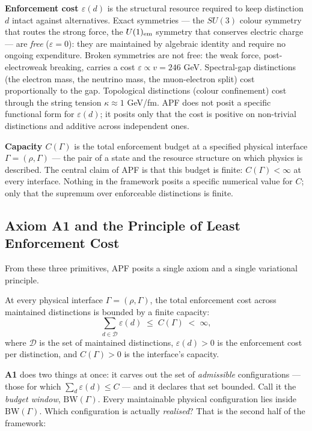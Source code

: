 \documentclass[11pt]{article}
\newcommand{\Aone}{\textbf{A1}}
\begin{document}
\smallskip
\noindent\textbf{Enforcement cost $\varepsilon(d)$} is the structural resource required to keep distinction $d$ intact against alternatives. Exact symmetries --- the $SU(3)$ colour symmetry that routes the strong force, the $U(1)_{\rm em}$ symmetry that conserves electric charge --- are \emph{free} ($\varepsilon = 0$): they are maintained by algebraic identity and require no ongoing expenditure. Broken symmetries are not free: the weak force, post-electroweak breaking, carries a cost $\varepsilon \propto v = 246$ GeV. Spectral-gap distinctions (the electron mass, the neutrino mass, the muon-electron split) cost proportionally to the gap. Topological distinctions (colour confinement) cost through the string tension $\kappa \approx 1$ GeV/fm. APF does not posit a specific functional form for $\varepsilon(d)$; it posits only that the cost is positive on non-trivial distinctions and additive across independent ones.

\smallskip
\noindent\textbf{Capacity $C(\Gamma)$} is the total enforcement budget at a specified physical interface $\Gamma = (\rho, \Gamma)$ --- the pair of a state and the resource structure on which physics is described. The central claim of APF is that this budget is finite: $C(\Gamma) < \infty$ at every interface. Nothing in the framework posits a specific numerical value for $C$; only that the supremum over enforceable distinctions is finite.

\subsection{Axiom \texorpdfstring{\Aone{}}{A1} and the Principle of Least Enforcement Cost}\label{sec:intro_A1_PLEC}

From these three primitives, APF posits a single axiom and a single variational principle.

\begin{tcolorbox}[apfbox, title={Axiom \Aone{} --- Finite Enforcement Capacity}]
At every physical interface $\Gamma = (\rho, \Gamma)$, the total enforcement cost across maintained distinctions is bounded by a finite capacity:
\[
\sum_{d \in \mathcal{D}} \varepsilon(d) \;\leq\; C(\Gamma) \;<\; \infty,
\]
where $\mathcal{D}$ is the set of maintained distinctions, $\varepsilon(d) > 0$ is the enforcement cost per distinction, and $C(\Gamma) > 0$ is the interface's capacity.
\end{tcolorbox}

\noindent \Aone{} does two things at once: it carves out the set of \emph{admissible} configurations --- those for which $\sum_d \varepsilon(d) \leq C$ --- and it declares that set bounded. Call it the \emph{budget window}, $\mathrm{BW}(\Gamma)$. Every maintainable physical configuration lies inside $\mathrm{BW}(\Gamma)$. Which configuration is actually \emph{realised}? That is the second half of the framework:
\end{document}
